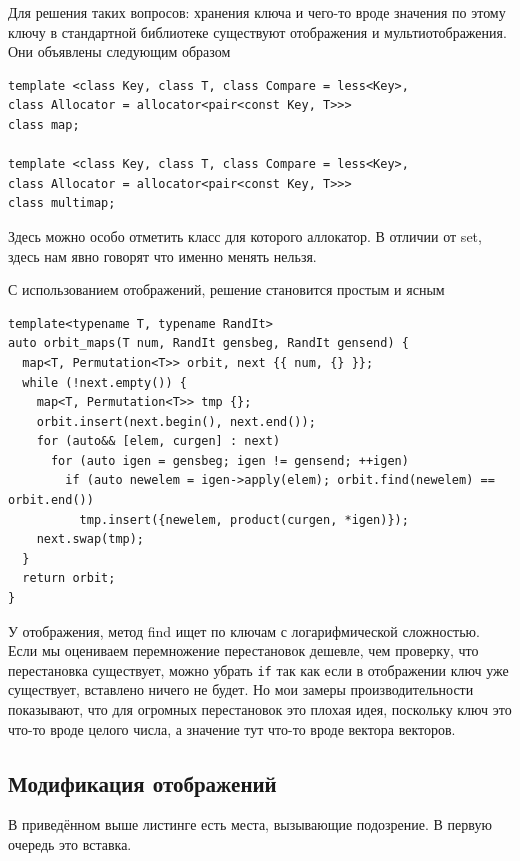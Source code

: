 \documentclass[a4paper,12pt,oneside]{book}
\newif\ifanswers
\begin{document}
\ifanswers
Правильный ответ: ключи. Множество хранит ключи, а \lstinline!find_if! предполагает что ключ более сложен, в частности чем-то ограничен и простой поиск по дереву уже не сработает.
\fi

Для решения таких вопросов: хранения ключа и чего-то вроде значения по этому ключу в стандартной библиотеке существуют отображения и мультиотображения. Они объявлены следующим образом

\begin{lstlisting}
template <class Key, class T, class Compare = less<Key>,
class Allocator = allocator<pair<const Key, T>>>
class map;

template <class Key, class T, class Compare = less<Key>,
class Allocator = allocator<pair<const Key, T>>>
class multimap;
\end{lstlisting}

Здесь можно особо отметить класс для которого аллокатор. В отличии от set, здесь нам явно говорят что именно менять нельзя.

С использованием отображений, решение становится простым и ясным

\begin{lstlisting}
template<typename T, typename RandIt>
auto orbit_maps(T num, RandIt gensbeg, RandIt gensend) {
  map<T, Permutation<T>> orbit, next {{ num, {} }};
  while (!next.empty()) {
    map<T, Permutation<T>> tmp {};
    orbit.insert(next.begin(), next.end());
    for (auto&& [elem, curgen] : next)
      for (auto igen = gensbeg; igen != gensend; ++igen)
        if (auto newelem = igen->apply(elem); orbit.find(newelem) == orbit.end())
          tmp.insert({newelem, product(curgen, *igen)});
    next.swap(tmp);
  }
  return orbit;
}
\end{lstlisting}

У отображения, метод find ищет по ключам с логарифмической сложностью. Если мы оцениваем перемножение перестановок дешевле, чем проверку, что перестановка существует, можно убрать \lstinline!if! так как если в отображении ключ уже существует, вставлено ничего не будет. Но мои замеры производительности показывают, что для огромных перестановок это плохая идея, поскольку ключ это что-то вроде целого числа, а значение тут что-то вроде вектора векторов.

\subsection{Модификация отображений}

В приведённом выше листинге есть места, вызывающие подозрение. В первую очередь это вставка.
\end{document}
